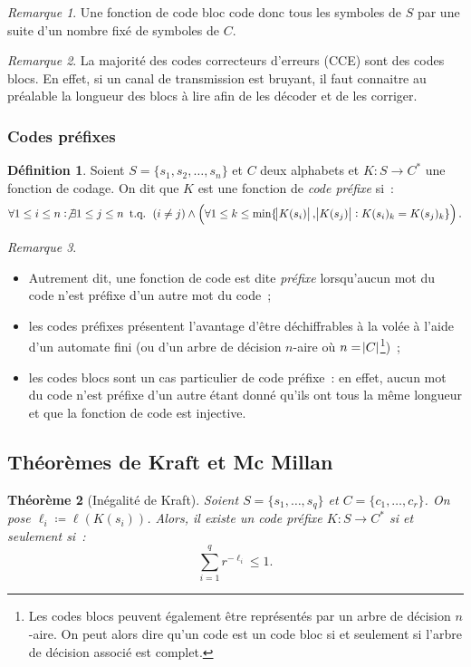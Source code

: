 \documentclass{article}
\DeclareMathOperator{\tq}{\text{ t.q. }}
\newtheorem{thm}{Théorème}[section]
\theoremstyle{definition}
\newtheorem{déf}[thm]{Définition}
\theoremstyle{remark}
\newtheorem*{rmq}{Remarque}
\begin{document}
			\begin{rmq} Une fonction de code bloc code donc tous les symboles de $S$ par une suite d'un nombre fixé de symboles de $C$. \end{rmq}

			\begin{rmq} La majorité des codes correcteurs d'erreurs (CCE) sont des codes blocs. En effet, si un canal de transmission est bruyant, il faut
			connaitre au préalable la longueur des blocs à lire afin de les décoder et de les corriger. \end{rmq}

		\subsubsection{Codes préfixes}
			\begin{déf} Soient $S = \{s_1, s_2, \ldots, s_n\}$ et $C$ deux alphabets et $K : S \to C^*$ une fonction de codage. On dit que $K$ est une
			fonction de \textit{code préfixe} si~:
			\[\forall 1 \leq i \leq n : \not \exists 1 \leq j \leq n \tq \left(i \neq j\right) \land
				\left(\forall 1 \leq k \leq \min\{\abs {K(s_i)}, \abs{K(s_j)} : K(s_i)_k = K(s_j)_k\}\right).\]
			\end{déf}

			\begin{rmq}~
			\begin{itemize}
				\item Autrement dit, une fonction de code est dite \textit{préfixe} lorsqu'aucun mot du code n'est préfixe d'un autre mot du code~;
				\item les codes préfixes présentent l'avantage d'être déchiffrables à la volée à l'aide d'un automate fini
				      (ou d'un arbre de décision $n$-aire où $n = \abs C$\footnote{Les codes blocs peuvent également être représentés par un arbre de
				      décision $n$-aire. On peut alors dire qu'un code est un code bloc si et seulement si l'arbre de décision associé est complet.})~;
				\item les codes blocs sont un cas particulier de code préfixe~: en effet, aucun mot du code n'est préfixe d'un autre étant donné qu'ils
				      ont tous la même longueur et que la fonction de code est injective.
			\end{itemize}
			\end{rmq}

	\subsection{Théorèmes de Kraft et Mc Millan}
		\begin{thm}[Inégalité de Kraft] Soient $S = \{s_1, \ldots, s_q\}$ et $C = \{c_1, \ldots, c_r\}$. On pose $\ell_i \coloneqq \ell(K(s_i))$.
		Alors, il existe un code préfixe $K : S \to C^*$ si et seulement si~:
		\[\sum_{i=1}^qr^{-\ell_i} \leq 1.\]
		\end{thm}
\end{document}
